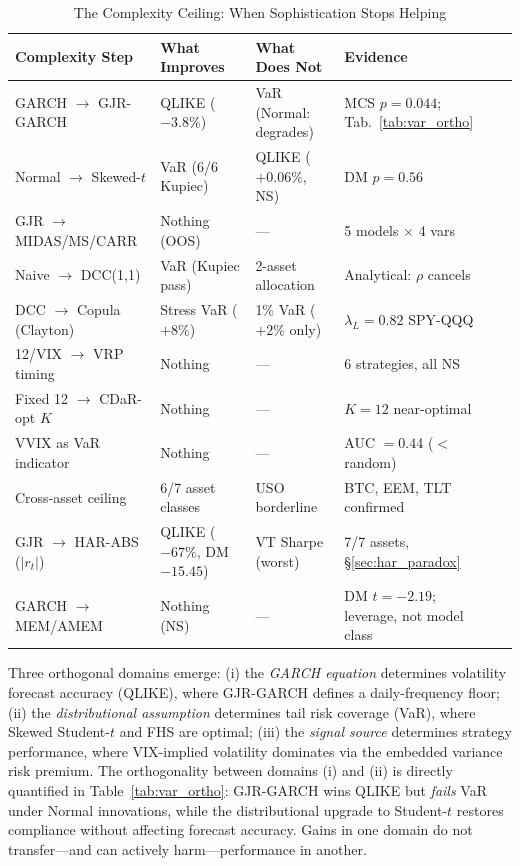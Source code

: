 \begin{table}[H]
\centering
\caption{The Complexity Ceiling: When Sophistication Stops Helping}
\label{tab:complexity_ceiling}
\small
\begin{tabular}{lllll}
\hline
Complexity Step & What Improves & What Does Not & Evidence \\
\hline
GARCH $\to$ GJR-GARCH & QLIKE ($-3.8\%$) & VaR (Normal: degrades) & MCS $p=0.044$; Tab.~\ref{tab:var_ortho} \\
Normal $\to$ Skewed-$t$ & VaR (6/6 Kupiec) & QLIKE ($+0.06\%$, NS) & DM $p=0.56$ \\
GJR $\to$ MIDAS/MS/CARR & Nothing (OOS) & --- & 5 models $\times$ 4 vars \\
Naive $\to$ DCC(1,1) & VaR (Kupiec pass) & 2-asset allocation & Analytical: $\rho$ cancels \\
DCC $\to$ Copula (Clayton) & Stress VaR ($+8\%$) & 1\% VaR ($+2\%$ only) & $\lambda_L=0.82$ SPY-QQQ \\
12/VIX $\to$ VRP timing & Nothing & --- & 6 strategies, all NS \\
Fixed 12 $\to$ CDaR-opt $K$ & Nothing & --- & $K=12$ near-optimal \\
VVIX as VaR indicator & Nothing & --- & AUC $= 0.44$ ($<$ random) \\
Cross-asset ceiling & 6/7 asset classes & USO borderline & BTC, EEM, TLT confirmed \\
GJR $\to$ HAR-ABS ($|r_t|$) & QLIKE ($-67\%$, DM $-15.45$) & VT Sharpe (worst) & 7/7 assets, \S\ref{sec:har_paradox} \\
GARCH $\to$ MEM/AMEM & Nothing (NS) & --- & DM $t = -2.19$; leverage, not model class \\
\hline
\end{tabular}
\end{table}

Three orthogonal domains emerge: (i) the \textit{GARCH equation} determines volatility forecast accuracy (QLIKE), where GJR-GARCH defines a daily-frequency floor; (ii) the \textit{distributional assumption} determines tail risk coverage (VaR), where Skewed Student-$t$ and FHS are optimal; (iii) the \textit{signal source} determines strategy performance, where VIX-implied volatility dominates via the embedded variance risk premium. The orthogonality between domains (i) and (ii) is directly quantified in Table~\ref{tab:var_ortho}: GJR-GARCH wins QLIKE but \textit{fails} VaR under Normal innovations, while the distributional upgrade to Student-$t$ restores compliance without affecting forecast accuracy. Gains in one domain do not transfer---and can actively harm---performance in another.

